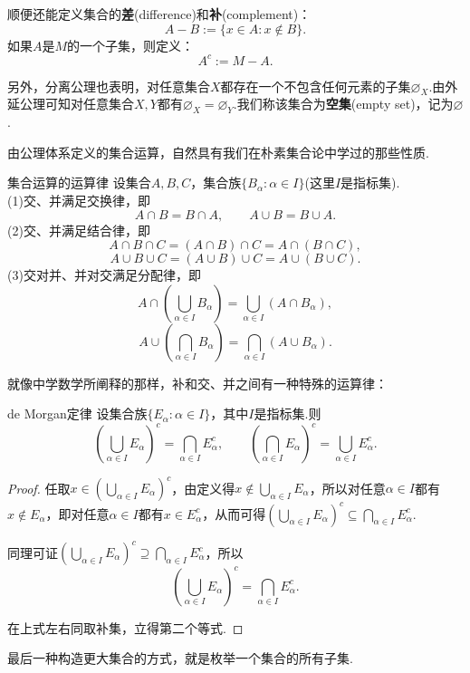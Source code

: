 \documentclass[lang=cn, zihao=5]{elegantbook}
\newcommand{\ssb}[1]{\left( #1 \right)}
\begin{document}
顺便还能定义集合的\textbf{差}(difference)和\textbf{补}(complement)：$$A - B := \{ x \in A : x \notin B \}.$$
如果$A$是$M$的一个子集，则定义：$$A^c := M - A.$$

另外，分离公理也表明，对任意集合$X$都存在一个不包含任何元素的子集$\varnothing _X$.由外延公理可知对任意集合$X,Y$都有$\varnothing _X = \varnothing _Y$.我们称该集合为\textbf{空集}(empty set)，记为$\varnothing$.

由公理体系定义的集合运算，自然具有我们在朴素集合论中学过的那些性质.

\begin{proposition}{集合运算的运算律}
	设集合$A,B,C$，集合族$\{ B_{\alpha} : \alpha \in I \}$(这里$I$是指标集). \\
	(1)交、并满足交换律，即$$A \cap B = B \cap A, \qquad A \cup B = B \cup A.$$
	(2)交、并满足结合律，即
	$$A \cap B \cap C = (A \cap B) \cap C = A \cap (B \cap C),$$
	$$A \cup B \cup C = (A \cup B) \cup C = A \cup (B \cup C).$$
	(3)交对并、并对交满足分配律，即
	$$A \cap \ssb{\bigcup_{\alpha \in I} B_\alpha} = \bigcup_{\alpha \in I} \ssb{A \cap B_{\alpha}},$$
	$$A \cup \ssb{\bigcap_{\alpha \in I} B_\alpha} = \bigcap_{\alpha \in I} \ssb{A \cup B_{\alpha}}.$$
\end{proposition}

就像中学数学所阐释的那样，补和交、并之间有一种特殊的运算律：

\begin{theorem}{de Morgan定律}
	设集合族$\{ E_{\alpha} : \alpha \in I \}$，其中$I$是指标集.则$$\ssb{\bigcup_{\alpha \in I}E_{\alpha} }^c = \bigcap_{\alpha \in I} E_{\alpha}^c,\qquad \ssb{\bigcap_{\alpha \in I}E_{\alpha} }^c = \bigcup_{\alpha \in I} E_{\alpha}^c.$$
\end{theorem}
\begin{proof}
	任取$x \in \ssb{\bigcup_{\alpha \in I}E_{\alpha} }^c$，由定义得$x \notin \bigcup_{\alpha \in I}E_{\alpha}$，所以对任意$\alpha \in I$都有$x \notin E_{\alpha}$，即对任意$\alpha \in I$都有$x \in E_{\alpha}^c$，从而可得$\ssb{\bigcup_{\alpha \in I}E_{\alpha} }^c \subseteq \bigcap_{\alpha \in I} E_{\alpha}^c$.
	
	同理可证$\ssb{\bigcup_{\alpha \in I}E_{\alpha} }^c \supseteq \bigcap_{\alpha \in I} E_{\alpha}^c$，所以$$\ssb{\bigcup_{\alpha \in I}E_{\alpha} }^c = \bigcap_{\alpha \in I} E_{\alpha}^c.$$
	
	在上式左右同取补集，立得第二个等式.
\end{proof}

最后一种构造更大集合的方式，就是枚举一个集合的所有子集.
\end{document}
